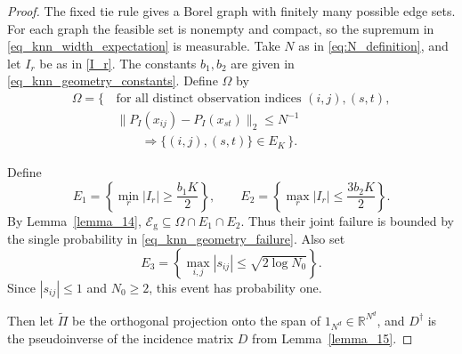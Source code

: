 \documentclass[twoside,11pt]{article}
\newenvironment{revision}{\color{revisionred}}{}
\begin{document}
\begin{proof}
\begin{revision}
The fixed tie rule gives a Borel graph with finitely many possible
edge sets. For each graph the feasible set is nonempty and compact,
so the supremum in \eqref{eq_knn_width_expectation} is measurable.
Take $N$ as in \eqref{eq:N_definition}, and let $I_r$ be as in
\eqref{I_r}. The constants $b_1,b_2$ are given in
\eqref{eq_knn_geometry_constants}. Define $\Omega$ by
\end{revision}
\begin{revision}
\begin{equation}
\label{def_omega}
\begin{aligned}
\Omega=\bigl\{\,
&\text{for all distinct observation indices }(i,j),(s,t),\\
&\|P_I(x_{ij})-P_I(x_{st})\|_2\leq N^{-1}\\
&\qquad\Longrightarrow
              \{(i,j),(s,t)\}\in E_K
\,\bigr\}.
\end{aligned}
\end{equation}
\end{revision}



\begin{revision}
Define
\[
E_1=\left\{\min_r|I_r|\geq\frac{b_1K}{2}\right\},
\qquad
E_2=\left\{\max_r|I_r|\leq\frac{3b_2K}{2}\right\}.
\]
By Lemma~\ref{lemma_14},
$\mathcal E_{\mathrm g}\subseteq\Omega\cap E_1\cap E_2$.
Thus their joint failure is bounded by the single probability
in \eqref{eq_knn_geometry_failure}.
Also set
\[
E_3=\left\{\max_{i,j}|s_{ij}|\leq\sqrt{2\log N_0}\right\}.
\]
Since $|s_{ij}|\leq1$ and $N_0\geq2$, this event has probability one.
\end{revision}

Then let \(\tilde \Pi\) be the orthogonal projection onto the span of \(1_{N^d} \in \mathbb{R}^{N^d}\), and \(D^\dag\) is the pseudoinverse of the incidence matrix \(D\) from Lemma~\ref{lemma_15}.



\end{proof}
\end{document}
